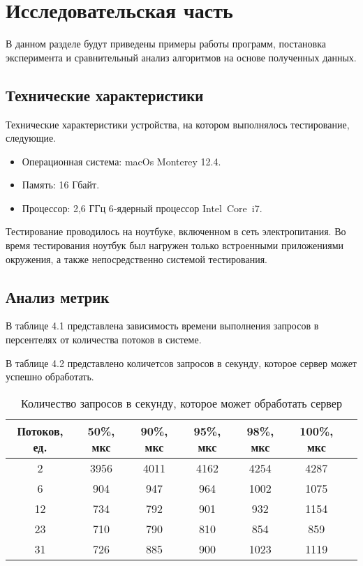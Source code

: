 \chapter{Исследовательская часть}

В данном разделе будут приведены примеры работы программ,
постановка эксперимента и сравнительный анализ алгоритмов на основе
полученных данных.

\section{Технические характеристики}

Технические характеристики устройства, на котором выполнялось тестирование,
следующие.

\begin{itemize}
	\item Операционная система: macOs Monterey 12.4\cite{ubuntu}.
	\item Память: 16 Гбайт.
	\item Процессор: 2,6 ГГц 6‑ядерный процессор Intel Core i7\cite{intel}.
\end{itemize}

Тестирование проводилось на ноутбуке, включенном в сеть электропитания.
Во время тестирования ноутбук был нагружен только встроенными приложениями
окружения, а также непосредственно системой тестирования.


\section{Анализ метрик}

В таблице 4.1 представлена зависимость времени выполнения запросов в персентелях от количества потоков в системе.

В таблице 4.2 представлено количетсов запросов в секунду, которое сервер может успешно обработать.


\begin{table}[h]
	\begin{center}
		\captionsetup{justification=raggedright,singlelinecheck=off}
		\caption{\label{tab:time0}Количество запросов в секунду, которое может обработать сервер}
		\begin{tabular}{|c|c|c|c|c|c|c|}
			\hline
			Потоков, ед. & 50\%, мкс & 90\%, мкс & 95\%, мкс & 98\%, мкс & 100\%, мкс\\
			\hline
			2  & 3956 & 4011 & 4162 & 4254 & 4287 \\
			\hline
			6  & 904 & 947 & 964 & 1002 & 1075 \\
			\hline
			12  & 734 & 792 & 901 & 932 & 1154 \\
			\hline
			23  & 710 & 790 & 810 & 854 & 859 \\
			\hline
			31  & 726 & 885 & 900 & 1023 & 1119 \\
			\hline
		\end{tabular}
	\end{center}
\end{table}

